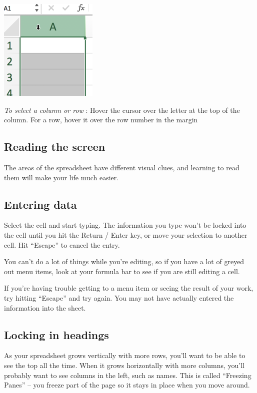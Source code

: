 \documentclass[
  letterpaper,
  DIV=11,
  numbers=noendperiod]{scrreprt}
\begin{document}
\includegraphics{./images/xl-refresher-columnselect.png}

\emph{To select a column or row} : Hover the cursor over the letter at
the top of the column. For a row, hover it over the row number in the
margin

\hypertarget{reading-the-screen}{%
\subsection{Reading the screen}\label{reading-the-screen}}

The areas of the spreadsheet have different visual clues, and learning
to read them will make your life much easier.

\hypertarget{entering-data}{%
\subsection{Entering data}\label{entering-data}}

Select the cell and start typing. The information you type won't be
locked into the cell until you hit the Return / Enter key, or move your
selection to another cell. Hit ``Escape'' to cancel the entry.

You can't do a lot of things while you're editing, so if you have a lot
of greyed out menu items, look at your formula bar to see if you are
still editing a cell.

If you're having trouble getting to a menu item or seeing the result of
your work, try hitting ``Escape'' and try again. You may not have
actually entered the information into the sheet.

\hypertarget{locking-in-headings}{%
\subsection{Locking in headings}\label{locking-in-headings}}

As your spreadsheet grows vertically with more rows, you'll want to be
able to see the top all the time. When it grows horizontally with more
columns, you'll probably want to see columns in the left, such as names.
This is called ``Freezing Panes'' -- you freeze part of the page so it
stays in place when you move around.
\end{document}
